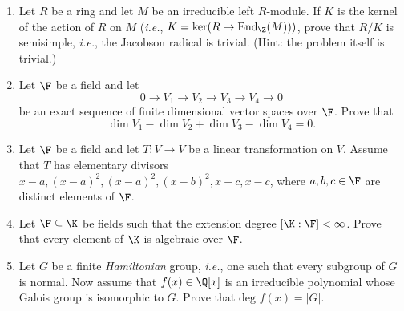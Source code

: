 \documentclass{article}
\begin{document}
\begin{Large}
\begin{enumerate}

\item Let $R$ be a ring and let $M$ be an irreducible left $R$-module.
If $K$ is the kernel of the action of $R$ on $M$ ({\em i.e.}, 
$K=\ker (R\to\mbox{End}_\Z(M)))$, prove that $R/K$ is semisimple,
{\em i.e.}, the Jacobson radical is trivial. (Hint: the problem
itself is trivial.)
\clearpage

\item Let $\F$ be a field and let
$$0\to V_1\to V_2\to V_3\to V_4\to 0$$
be an exact sequence of finite dimensional vector spaces over $\F$. Prove
that 
$$\dim V_1-\dim V_2 +\dim V_3 -\dim V_4 =0.$$

\item Let $\F$ be a field and let $T:V\to V$ be a linear transformation
on $V$. Assume that $T$ has elementary divisors $x-a, (x-a)^2,(x-a)^2,
(x-b)^2, x-c, x-c$, where $a,b,c\in\F$ are distinct elements of $\F$.

\item Let $\F\subseteq \K$ be fields such that the extension degree
$[\K:\F]<\infty $. Prove that every element of $\K$ is algebraic 
over $\F$.

\item Let $G$ be a finite {\em Hamiltonian} group, {\em i.e.}, one such that
every subgroup of $G$ is normal. Now assume that $f(x)\in\Q[x]$ is an
irreducible polynomial whose Galois group is isomorphic to $G$. 
Prove that $\mbox{deg }f(x)=|G|$.






    
\end{enumerate}
\end{Large} 
\end{document}
